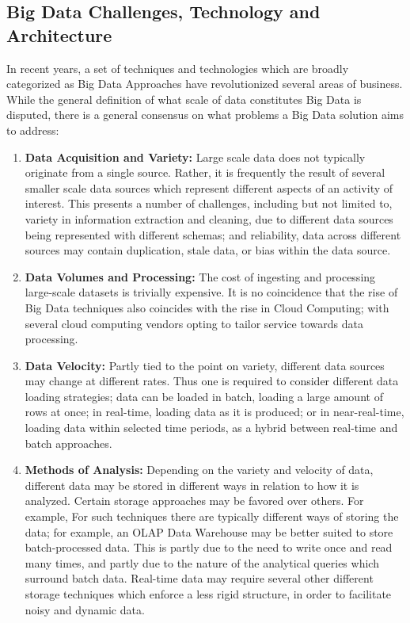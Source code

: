 \documentclass[10pt,journal,final,a4paper]{IEEEtran}
\begin{document}
\subsection{Big Data Challenges, Technology and Architecture}
In recent years, a set of techniques and technologies which are broadly categorized as Big Data Approaches have revolutionized several areas of business. While the general definition of what scale of data constitutes Big Data is disputed, there is a general consensus on what problems a Big Data solution aims to address:
\begin{enumerate}
\item \textbf{Data Acquisition and Variety:} Large scale data does not typically originate from a single source. Rather, it is frequently the result of several smaller scale data sources which represent different aspects of an activity of interest. This presents a number of challenges, including but not limited to, variety in information extraction and cleaning, due to different data sources being represented with different schemas; and reliability, data across different sources may contain duplication, stale data, or bias within the data source\cite{bigdata_survey}.
\item \textbf{Data Volumes and Processing:} The cost of ingesting and processing large-scale datasets is trivially expensive. It is no coincidence that the rise of Big Data techniques also coincides with the rise in Cloud Computing; with several cloud computing vendors opting to tailor service towards data processing.
\item \textbf{Data Velocity:} Partly tied to the point on variety, different data sources may change at different rates. Thus one is required to consider different data loading strategies; data can be loaded in batch, loading a large amount of rows at once; in real-time, loading data as it is produced; or in near-real-time, loading data within selected time periods, as a hybrid between real-time and batch approaches. 
\item \textbf{Methods of Analysis:} Depending on the variety and velocity of data, different data may be stored in different ways in relation to how it is analyzed. Certain storage approaches may be favored over others. For example, 
For such techniques there are typically different ways of storing the data; for example, an OLAP Data Warehouse may be better suited to store batch-processed data. This is partly due to the need to write once and read many times, and partly due to the nature of the analytical queries which surround batch data. Real-time data may require several other different storage techniques which enforce a less rigid structure, in order to facilitate noisy and dynamic data. 
\end{enumerate} 
\end{document}
